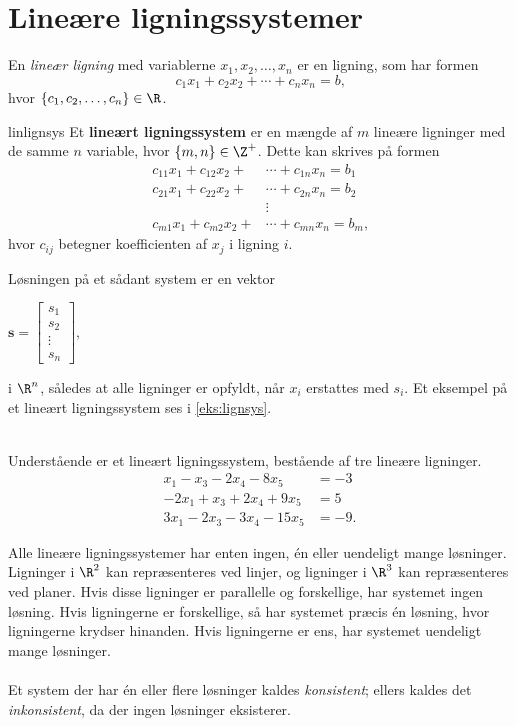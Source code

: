 \section{Lineære ligningssystemer }
%
En \textit{lineær ligning} med variablerne $x_1,x_2,\ldots ,x_n$ er en ligning, som har formen
$$ c_1x_1+c_2x_2+\cdots+c_nx_n=b \text{,}$$ 
hvor $\{c_1,c_2,\ldots,c_n\} \in \R$. 
%
\begin{defn}{}{linlignsys}
Et \textbf{lineært ligningssystem} er en mængde af $m$ lineære ligninger med de samme $n$ variable, hvor $\{m, n\} \in \Z^+$.
Dette kan skrives på formen
\begin{align*}
c_{11}x_1+c_{12}x_2+&\cdots+c_{1n}x_n=b_1\\
c_{21}x_1+c_{22}x_2+&\cdots+c_{2n}x_n=b_2\\
&\vdots\\
c_{m1}x_1+c_{m2}x_2+&\cdots +c_{mn}x_n=b_m
\text{,}
\end{align*}
hvor $c_{ij}$ betegner koefficienten af $x_j$ i ligning $i$.
\end{defn}
\noindent
Løsningen på et sådant system er en vektor
\begin{center}
$
\mathbf{s} = 
\begin{bmatrix}
s_1\\
s_2\\
\vdots\\
s_n
\end{bmatrix},
$
\end{center}
i $\R ^n$, således at alle ligninger er opfyldt, når $x_i$ erstattes med $s_i$. Et eksempel på et lineært ligningssystem ses i \ref{eks:lignsys}.
%
\\\\
%
\begin{eks}
\label{eks:lignsys}
Understående er et lineært ligningssystem, bestående af tre lineære ligninger.
%
\begin{align*}
x_1-x_3-2x_4-8x_5&=-3 \\
-2x_1+x_3+2x_4+9x_5&=5 \\
3x_1-2x_3-3x_4-15x_5&=-9.
\end{align*}
%
%
%
\end{eks}
%
Alle lineære ligningssystemer har enten ingen, én eller uendeligt mange løsninger.
Ligninger i $\R^2$ kan repræsenteres ved linjer, og ligninger i $\R^3$ kan repræsenteres ved planer.
Hvis disse ligninger er parallelle og forskellige, har systemet ingen løsning.
Hvis ligningerne er forskellige, så har systemet præcis én løsning, hvor ligningerne krydser hinanden. 
Hvis ligningerne er ens, har systemet uendeligt mange løsninger.
\\\\
%
Et system der har én eller flere løsninger kaldes \textit{konsistent}; ellers kaldes det \textit{inkonsistent}, da der ingen løsninger eksisterer.
%
%
